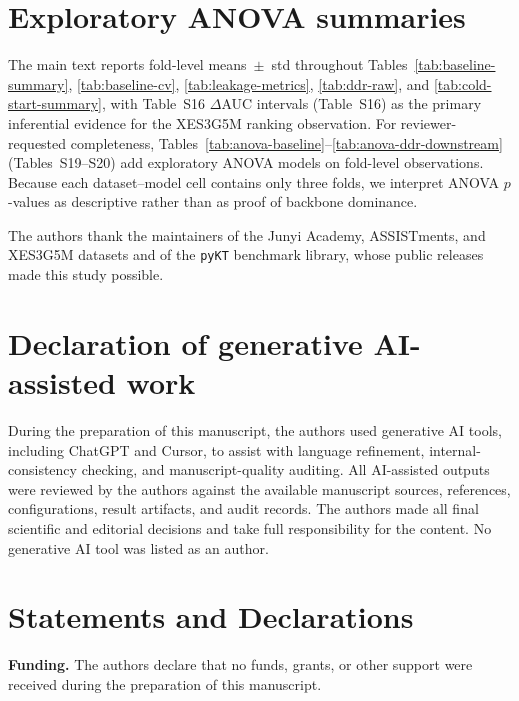 \documentclass[pdflatex,sn-mathphys-num]{sn-jnl}
\begin{document}
\section{Exploratory ANOVA summaries}
\label{sec:supp-anova}
The main text reports fold-level means~$\pm$~std throughout
Tables~\ref{tab:baseline-summary}, \ref{tab:baseline-cv},
\ref{tab:leakage-metrics}, \ref{tab:ddr-raw}, and
\ref{tab:cold-start-summary}, with Table~S16 $\Delta$AUC intervals
(Table~S16) as the primary inferential evidence for the XES3G5M ranking
observation. For reviewer-requested completeness, Tables~\ref{tab:anova-baseline}--\ref{tab:anova-ddr-downstream}
(Tables~S19--S20) add exploratory ANOVA models on fold-level observations. Because each
dataset--model cell contains only three folds, we interpret ANOVA
$p$-values as descriptive rather than as proof of backbone dominance.





\backmatter

The authors thank the maintainers of the Junyi Academy, ASSISTments, and
XES3G5M datasets and of the \texttt{pyKT} benchmark library, whose public
releases made this study possible.

\section*{Declaration of generative AI-assisted work}
During the preparation of this manuscript, the authors used
generative AI tools, including ChatGPT and Cursor, to assist with
language refinement, internal-consistency checking, and
manuscript-quality auditing. All AI-assisted outputs were reviewed
by the authors against the available manuscript sources, references,
configurations, result artifacts, and audit records. The authors made
all final scientific and editorial decisions and take full
responsibility for the content. No generative AI tool was listed as
an author.

\section*{Statements and Declarations}

\noindent\textbf{Funding.} The authors declare that no funds, grants, or other
support were received during the preparation of this manuscript.
\end{document}
